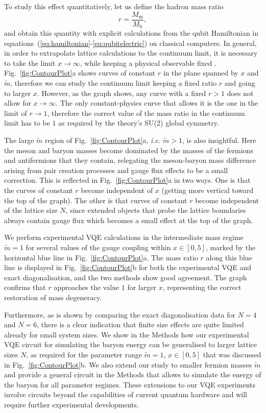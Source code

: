 \documentclass[twocolumn,aps,showpacs,prb,superscriptaddress,floatfix,10pt,nofootinbib]{revtex4-2}
\newcommand{\ratio}{r} %
\begin{document}
To study this effect quantitatively, let us define the hadron mass ratio
\begin{equation}
    \label{eq:ratio}
    r = \frac{M_\text{m}}{M_\text{b}},
\end{equation}
and obtain this quantity with explicit calculations from the qubit Hamiltonian in equations~(\ref{eq:hamiltonian}-\ref{eq:qubitelectric}) on classical computers. 
In general, in order to extrapolate lattice calculations to the continuum limit, it is necessary to take the limit $x\to\infty$, while keeping a physical observable fixed \cite{Gattringer:2010zz}. Fig.~\ref{fig:ContourPlot}a shows curves of constant $\ratio$ in the plane spanned by $x$ and $\tilde m$, therefore we can study the continuum limit keeping a fixed ratio $\ratio$ and going to larger $x$. However, as the graph shows, any curve with a fixed $\ratio >1 $ does not allow for $x\to \infty$. The only constant-physics curve that allows it is the one in the limit of $\ratio\to 1$, therefore the correct value of the mass ratio in the continuum limit has to be $1$ as required by the theory's SU(2) global symmetry.

The large $\tilde m$ region of Fig.~\ref{fig:ContourPlot}a, \textit{i.e.} $\tilde m>1$, is also insightful.  Here the meson and baryon masses become dominated by the masses of the fermions and antifermions that they contain, relegating the meson-baryon mass difference arising from pair creation processes and gauge flux effects to be a small correction.  This is reflected in Fig.~\ref{fig:ContourPlot}a in two ways.  One is that the curves of constant $\ratio$ become independent of $x$ (getting more vertical toward the top of the graph). The other is that curves of constant $\ratio$ become independent of the lattice size $N$, since extended objects that probe the lattice boundaries always contain gauge flux which becomes a small effect at the top of the graph.


We perform experimental VQE calculations in the intermediate mass regime $\tilde m=1$ for several values of the gauge coupling within $x\in[0,5]$, marked by the horizontal blue line in Fig.~\ref{fig:ContourPlot}a.
The mass ratio $\ratio$ along this blue line is displayed in Fig.~\ref{fig:ContourPlot}b for both the experimental VQE and exact diagonalisation, and the two methods show good agreement.
The graph confirms that $r$ approaches the value $1$ for larger $x$, representing the correct restoration of mass degeneracy.

Furthermore, as is shown by comparing the exact diagonalisation data for $N = 4$ and $N = 6$, there is a clear indication that finite size effects are quite limited already for small system sizes. We show in the Methods how our experimental VQE circuit for simulating the baryon energy can be generalised to larger lattice sizes $N$, as required for the parameter range $\tilde m=1$, $x\in[0,5]$ that was discussed in Fig.~\ref{fig:ContourPlot}b. 
We also extend our study to smaller fermion masses $\tilde m$ and provide a general circuit in the Methods that allows to simulate the energy of the baryon for all parameter regimes. These extensions to our VQE experiments involve circuits beyond the capabilities of current quantum hardware and will require further experimental developments.
\end{document}
